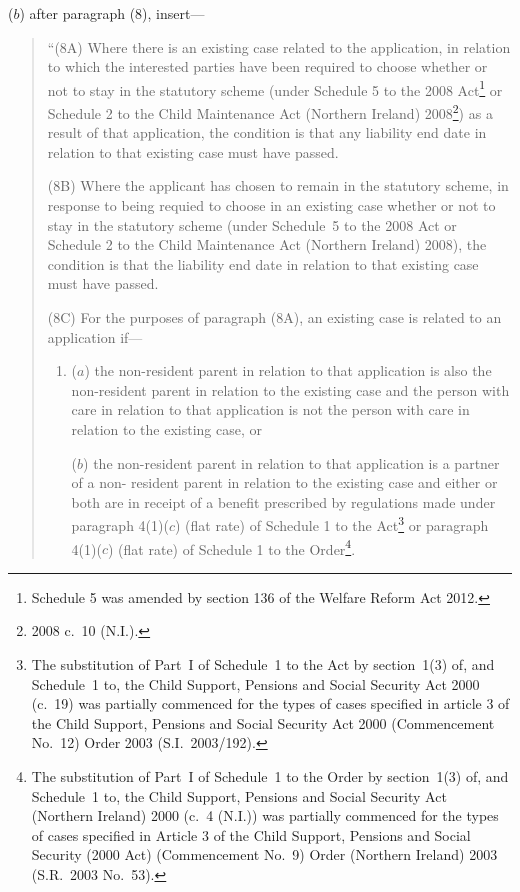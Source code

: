 \documentclass[12pt,a4paper]{article}
\begin{document}
\begin{enumerate}
($b$) after paragraph (8), insert---

\begin{quotation}
``(8A) Where there is an existing case related to the application, in relation to
which the interested parties have been required to choose whether or not to stay in 
the statutory scheme (under Schedule 5 to the 2008 Act\footnote{Schedule 5 was amended by section 136 of the Welfare Reform Act 2012.} or Schedule 2 to the Child
Maintenance Act (Northern Ireland) 2008\footnote{2008 c.~10 (N.I.).}) as a result of that application, the
condition is that any liability end date in relation to that existing case must have
passed.

(8B) Where the applicant has chosen to remain in the statutory scheme, in response
to being requied to choose in an existing case whether or not to stay in the statutory 
scheme (under Schedule~5 to the 2008 Act or Schedule 2 to the Child Maintenance 
Act (Northern Ireland) 2008), the condition is that the liability end date in relation to
that existing case must have passed.

(8C) For the purposes of paragraph (8A), an existing case is related to an
application if---
\begin{enumerate}\item[]
($a$) the non-resident parent in relation to that application is also the non-resident
parent in relation to the existing case and the person with care in relation to
that application is not the person with care in relation to the existing case, or

($b$) the non-resident parent in relation to that application is a partner of a non-%
resident parent in relation to the existing case and either or both are in 
receipt of a benefit prescribed by regulations made under paragraph 4(1)($c$)
(flat rate) of Schedule 1 to the Act\footnote{The substitution of Part~I of Schedule~1 to the Act by section~1(3) of, and Schedule~1 to, the Child Support, Pensions and Social Security Act 2000 (c.~19) was partially commenced for the types of cases specified in article 3 of the Child Support, Pensions and Social Security Act 2000 (Commencement No.~12) Order 2003 (S.I.~2003/192).} or paragraph 4(1)($c$) (flat rate) of
Schedule 1 to the Order\footnote{The substitution of Part~I of Schedule~1 to the Order by section~1(3) of, and Schedule~1 to, the Child Support, Pensions and Social Security Act (Northern Ireland) 2000 (c.~4 (N.I.)) was partially commenced for the types of cases specified in Article 3 of the Child Support, Pensions and Social Security (2000 Act) (Commencement No.~9) Order (Northern Ireland) 2003 (S.R.~2003 No.~53).}.
\end{enumerate}


\end{quotation}
\end{enumerate}
\end{document}
